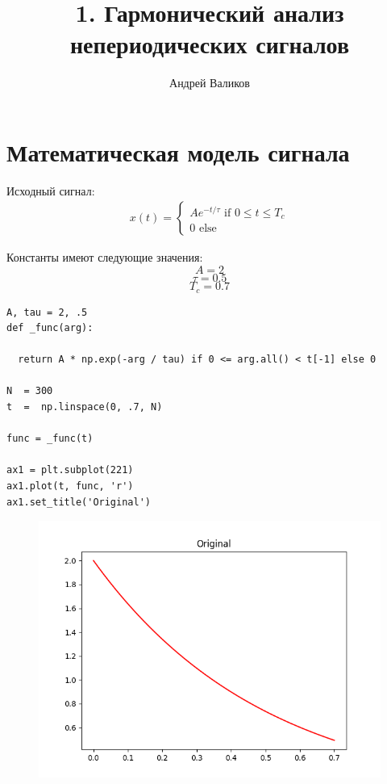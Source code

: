 \documentclass[12pt]{article}
\begin{document}
\title{1. Гармонический анализ непериодических сигналов}
\author{Андрей Валиков}
\date{}
\maketitle
																																																								\section{Математическая модель сигнала}
Исходный сигнал:
\begin{gather*}
x(t) = 
\begin{cases}
  Ae^{-t/\tau} \text{ if $0\leq t\leq T_c$}\\
  0 \text{ else}    
\end{cases}
\end{gather*}

\noindent Константы имеют следующие значения:
\[A = 2\]
\[\tau = 0.5\]
\[T_c = 0.7\]

\begin{lstlisting}
A, tau = 2, .5
def _func(arg):

  return A * np.exp(-arg / tau) if 0 <= arg.all() < t[-1] else 0

N  = 300
t  =  np.linspace(0, .7, N)

func = _func(t)

ax1 = plt.subplot(221)
ax1.plot(t, func, 'r')
ax1.set_title('Original')
\end{lstlisting}

\begin{figure}[htp]
\centering
\includegraphics[scale=1.00]{original.png}
\caption{}
\label{}
\end{figure}
\end{document}
